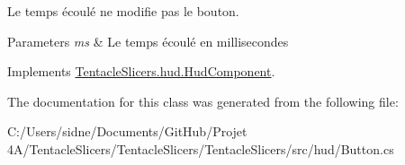 Le temps écoulé ne modifie pas le bouton. 


\begin{DoxyParams}{Parameters}
{\em ms} & Le temps écoulé en millisecondes \\
\hline
\end{DoxyParams}


Implements \hyperlink{class_tentacle_slicers_1_1hud_1_1_hud_component}{Tentacle\+Slicers.\+hud.\+Hud\+Component}.



The documentation for this class was generated from the following file\+:\begin{DoxyCompactItemize}
\item 
C\+:/\+Users/sidne/\+Documents/\+Git\+Hub/\+Projet 4\+A/\+Tentacle\+Slicers/\+Tentacle\+Slicers/\+Tentacle\+Slicers/src/hud/Button.\+cs\end{DoxyCompactItemize}
